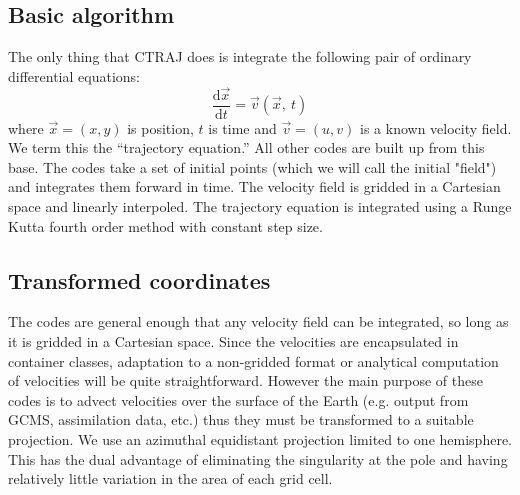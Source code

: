 

%



\subsection{Basic algorithm}

The only thing that CTRAJ does is integrate 
the following pair of ordinary differential equations:
\begin{equation}
\frac{\mathrm d \vec x}{\mathrm d t} = \vec v(\vec x, ~t)
\end{equation}
where $\vec x=(x, y)$ is position, 
$t$ is time
and $\vec v = (u, v)$ is a known velocity field.
We term this the ``trajectory equation.''
All other codes are built up from this base.
The codes take a set of initial points (which we will call the initial "field")
and integrates them forward in time.
The velocity field is gridded in a Cartesian space and linearly interpoled.
The trajectory equation is integrated
using a Runge Kutta fourth order method with constant step size.

\subsection{Transformed coordinates}

The codes are general enough that any velocity field can
be integrated, so long as it is gridded in a Cartesian space.
Since the velocities are encapsulated in container classes,
adaptation to a non-gridded format or analytical computation
of velocities will be quite straightforward.
However the main purpose of these codes is to advect velocities
over the surface of the Earth (e.g. output from GCMS, assimilation data,
etc.) thus they must be transformed to a suitable projection.
We use an azimuthal equidistant projection limited to one hemisphere.
This has the dual advantage of eliminating the singularity at the
pole and having relatively little variation in the area of each grid cell.

